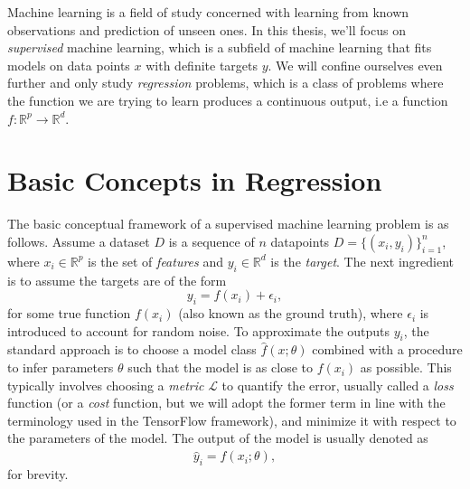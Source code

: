 
Machine learning is a field of study concerned with learning from known observations and prediction of unseen ones. 
In this thesis, we'll focus on \textit{supervised} machine learning, 
which is a subfield of machine learning that fits models on data points $x$ with definite targets $y$. 
We will confine ourselves even further and only study \textit{regression} problems, which is a class of problems where the function 
we are trying to learn produces a continuous output, i.e a function $f : \mathbb{R}^p \to \mathbb{R}^d$.

\section{Basic Concepts in Regression}\label{sec:basic_concepts}

The basic conceptual framework of a supervised machine learning problem is as follows. 
Assume a dataset $D$ is a sequence of $n$ datapoints $D = \{(x_i, y_i)\}_{i=1}^n$,
where $x_i \in \mathbb{R}^p$ is the set of \textit{features} 
and $y_i \in \mathbb{R}^d$ is the \textit{target}. 
The next ingredient is to assume the targets are of the form 
\begin{equation}\label{eq:model_assumption}
	y_i = f(x_i) + \epsilon_i,
\end{equation}
for some true function $f({x}_i)$ (also known as the ground truth), where $\epsilon_i$ is introduced to account for random noise. 
To approximate the outputs $y_i$, the standard approach is to choose a model class $\hat{f}(x; \theta)$ 
combined with a procedure to infer parameters $\theta$ such that the model is as close to $f(x_i)$ as possible. 
This typically involves choosing a \textit{metric} $\mathcal{L}$ to quantify the error, usually called a \textit{loss} function 
(or a \textit{cost} function, but we will adopt the former term in line with the terminology used in the TensorFlow framework), 
and minimize it with respect to the parameters of the model. The output of the model is usually denoted as
\begin{equation}
	\hat{y}_i = \hat{f}(x_i; \theta),
\end{equation}
for brevity.


